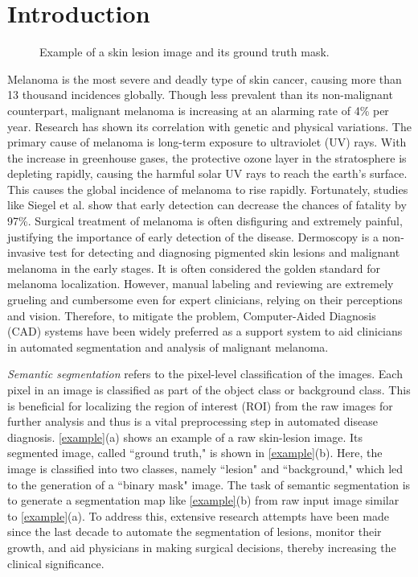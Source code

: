 \documentclass[review]{elsarticle}
\begin{document}
\section{Introduction}\label{intro}

\begin{figure}
    \centering
    \;\;
    \caption{Example of a skin lesion image and its ground truth mask.}
    \label{example}
\end{figure}

Melanoma is the most severe and deadly type of skin cancer, causing more than 13 thousand incidences globally. Though less prevalent than its non-malignant counterpart, malignant melanoma is increasing at an alarming rate of 4\% per year. Research has shown its correlation with genetic and physical variations. The primary cause of melanoma is long-term exposure to ultraviolet (UV) rays. With the increase in greenhouse gases, the protective ozone layer in the stratosphere is depleting rapidly, causing the harmful solar UV rays to reach the earth's surface. This causes the global incidence of melanoma to rise rapidly. Fortunately, studies like Siegel et al. \cite{siegel2019cancer} show that early detection can decrease the chances of fatality by 97\%. Surgical treatment of melanoma is often disfiguring and extremely painful, justifying the importance of early detection of the disease. Dermoscopy is a non-invasive test for detecting and diagnosing pigmented skin lesions and malignant melanoma in the early stages. It is often considered the golden standard for melanoma localization. However, manual labeling and reviewing are extremely grueling and cumbersome even for expert clinicians, relying on their perceptions and vision. Therefore, to mitigate the problem, Computer-Aided Diagnosis (CAD) systems have been widely preferred as a support system to aid clinicians in automated segmentation and analysis of malignant melanoma.



\textit{Semantic segmentation} refers to the pixel-level classification of the images. Each pixel in an image is classified as part of the object class or background class. This is beneficial for localizing the region of interest (ROI) from the raw images for further analysis and thus is a vital preprocessing step in automated disease diagnosis. \autoref{example}(a) shows an example of a raw skin-lesion image. Its segmented image, called ``ground truth," is shown in \autoref{example}(b). Here, the image is classified into two classes, namely ``lesion" and ``background," which led to the generation of a ``binary mask" image. The task of semantic segmentation is to generate a segmentation map like \autoref{example}(b) from raw input image similar to \autoref{example}(a). To address this, extensive research attempts have been made since the last decade to automate the segmentation of lesions, monitor their growth, and aid physicians in making surgical decisions, thereby increasing the clinical significance.
\end{document}
